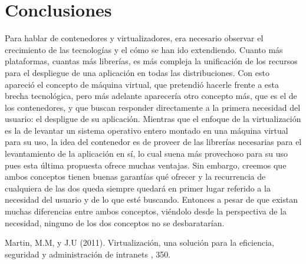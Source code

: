 \documentclass[twoside,twocolumn]{article}
\begin{document}
\section{Conclusiones}

Para hablar de contenedores y virtualizadores, era necesario observar el crecimiento de las tecnologías y el cómo se han ido extendiendo. Cuanto más plataformas, cuantas más librerías, es más compleja la unificación de los recursos para el despliegue de una aplicación en todas las distribuciones. Con esto apareció el concepto de máquina virtual, que pretendió hacerle frente a esta brecha tecnológica, pero más adelante aparecería otro concepto más, que es el de los contenedores, y que buscan responder directamente a la primera necesidad del usuario: el despligue de su aplicación.
Mientras que el enfoque de la virtualización es la de levantar un sistema operativo entero montado en una máquina virtual para su uso, la idea del contenedor es de proveer de las librerías necesarias para el levantamiento de la aplicación en sí, lo cual suena más provechoso para su uso pues esta última propuesta ofrece muchas ventajas. Sin embargo, creemos que ambos conceptos tienen buenas garantías qué ofrecer y la recurrencia de cualquiera de las dos queda siempre quedará en primer lugar referido a la necesidad del usuario y de lo que esté buscando. Entonces a pesar de que existan muchas diferencias entre ambos conceptos, viéndolo desde la perspectiva de la necesidad, ninguno de los dos conceptos no se desbaratarían.

\begin{thebibliography}{99} %

Martin, M.M,  y J.U (2011).
\newblock Virtualización, una solución para la eficiencia,
seguridad y administración de intranets
, 350.
 
 
\end{thebibliography}

\end{document}
